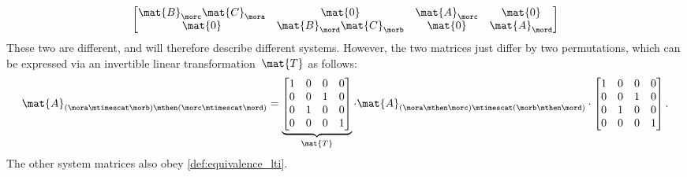 \begin{example}
\begin{equation*}
\begin{bmatrix}
            \mat{B}_\morc \mat{C}_\mora & \mat{0}                     & \mat{A}_\morc & \mat{0}       \\
            \mat{0}                     & \mat{B}_\mord \mat{C}_\morb & \mat{0}       & \mat{A}_\mord
        \end{bmatrix}
    \end{equation*}
    These two are different, and will therefore describe different systems.
    However, the two matrices just differ by two permutations, which can be expressed via an invertible linear transformation~$\mat{T}$ as follows:
    \begin{equation*}
        \mat{A}_{(\mora\mtimescat \morb)\mthen (\morc\mtimescat \mord)}=
        \underbrace{\begin{bmatrix}
                1 & 0 & 0 & 0 \\
                0 & 0 & 1 & 0 \\
                0 & 1 & 0 & 0 \\
                0 & 0 & 0 & 1
            \end{bmatrix}}_{\mat{T}}\cdot
        \mat{A}_{(\mora \mthen \morc)\mtimescat (\morb\mthen \mord)}
        \cdot
        \begin{bmatrix}
            1 & 0 & 0 & 0 \\
            0 & 0 & 1 & 0 \\
            0 & 1 & 0 & 0 \\
            0 & 0 & 0 & 1
        \end{bmatrix}.
    \end{equation*}
    The other system matrices also obey \cref{def:equivalence_lti}.
\end{example}

